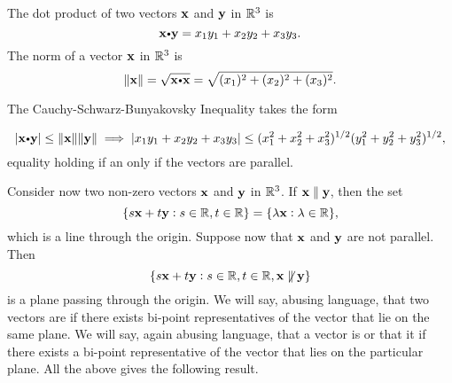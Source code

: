 \begin{df}
The dot product of two vectors $\mathbf{ x}$ and $\mathbf{ y}$ in
$\mathbb{R}^3$ is
$$\dotprod{x}{y} = x_1y_1+x_2y_2+x_3y_3.  $$ The norm of a vector
$\mathbf{ x}$ in $\mathbb{R}^3$ is $$ \norm{\vector{x}} =
\sqrt{\dotprod{x}{x}} = \sqrt{(x_1)^2+(x_2)^2+(x_3)^2}.
$$
\end{df}


The Cauchy-Schwarz-Bunyakovsky Inequality takes the form

$$|\dotprod{x}{y}|\leq
\norm{\vector{x}}\norm{\vector{y}} \implies |x_1y_1+x_2y_2+x_3y_3|\leq 
(x_1 ^2+x_2 ^2 + x_3 ^2)^{1/2} (y_1^2+y_2 ^2 + y_3 ^2)^{1/2},   $$
equality holding if an only if the vectors are parallel.
% 
% 


Consider now two non-zero vectors $\mathbf{ x}$ and $\mathbf{ y}$ in
$\mathbb{R}^3$. If $\mathbf{ x}\parallel \mathbf{ y}$, then the set
$$ \{s\mathbf{ x}+t\mathbf{ y}: s\in\mathbb{R}, t\in\mathbb{R}\}= \{\lambda\mathbf{ x}: \lambda \in\mathbb{R}\},  $$
which is a line through the origin. Suppose now that $\mathbf{ x}$
and $\mathbf{ y}$  are not parallel. Then
$$ \{s\mathbf{ x}+t\mathbf{ y}: s\in\mathbb{R}, t\in\mathbb{R}, \mathbf{ x}\not\parallel \mathbf{ y} \}$$is a plane passing through the origin.
We will say, abusing language, that two vectors are 
if there exists bi-point representatives of the vector that lie on
the same plane. We will say, again abusing language, that a vector
is  or that it  if there exists a bi-point representative of the
vector that lies on the particular plane. All the above gives the
following result.


